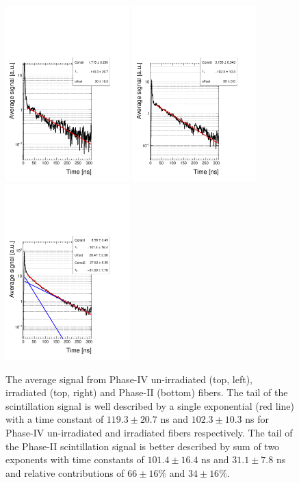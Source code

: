\documentclass[a4paper,11pt]{article}
\begin{document}
\begin{figure}[ht]
\begin{center}
      \includegraphics[width=4.8cm]{Figures/B5_R11864_fit_zoom_singleLog.pdf}
      \includegraphics[width=4.8cm]{Figures/B4_R11863_fit_zoom_singleLog.pdf}
      \includegraphics[width=4.8cm]{Figures/B1_R11862_fit_zoom_singleLog.pdf}
\caption{\small The average signal from Phase-IV un-irradiated (top, left), irradiated (top, right) and Phase-II (bottom) fibers. The tail of the scintillation signal is well described by a single exponential (red line) with a time constant of $119.3 \pm 20.7$ ns and $102.3 \pm 10.3$ ns for Phase-IV un-irradiated and irradiated fibers respectively. The tail of the Phase-II scintillation signal is better described by sum of two exponents with time constants of $101.4 \pm 16.4$ ns and $31.1  \pm 7.8$ ns and relative contributions of $66 \pm 16 \%$ and $34 \pm 16 \%$.}
    \label{fig:phase4scintTime}
\end{center}
\end{figure}
\end{document}
